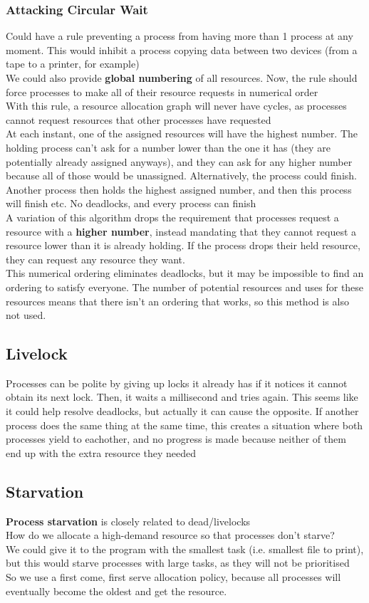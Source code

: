 \documentclass{article}
\begin{document}
\subsubsection*{Attacking Circular Wait}
Could have a rule preventing a process from having more than 1 process at any moment. This would inhibit a process copying data between two devices (from a tape to a printer, for example)
\\We could also provide \textbf{global numbering} of all resources. Now, the rule should force processes to make all of their resource requests in numerical order
\\With this rule, a resource allocation graph will never have cycles, as processes cannot request resources that other processes have requested
\\At each instant, one of the assigned resources will have the highest number. The holding process can't ask for a number lower than the one it has (they are potentially already assigned anyways), and they can ask for any higher number because all of those would be unassigned. Alternatively, the process could finish. Another process then holds the highest assigned number, and then this process will finish etc. No deadlocks, and every process can finish
\\A variation of this algorithm drops the requirement that processes request a resource with a \textbf{higher number}, instead mandating that they cannot request a resource lower than it is already holding. If the process drops their held resource, they can request any resource they want.
\\This numerical ordering eliminates deadlocks, but it may be impossible to find an ordering to satisfy everyone. The number of potential resources and uses for these resources means that there isn't an ordering that works, so this method is also not used.
\subsection*{Livelock}
Processes can be polite by giving up locks it already has if it notices it cannot obtain its next lock. Then, it waits a millisecond and tries again. This seems like it could help resolve deadlocks, but actually it can cause the opposite. If another process does the same thing at the same time, this creates a situation where both processes yield to eachother, and no progress is made because neither of them end up with the extra resource they needed
\subsection*{Starvation}
\textbf{Process starvation} is closely related to dead/livelocks
\\How do we allocate a high-demand resource so that processes don't starve?
\\We could give it to the program with the smallest task (i.e. smallest file to print), but this would starve processes with large tasks, as they will not be prioritised
\\So we use a first come, first serve allocation policy, because all processes will eventually become the oldest and get the resource.
\end{document}

